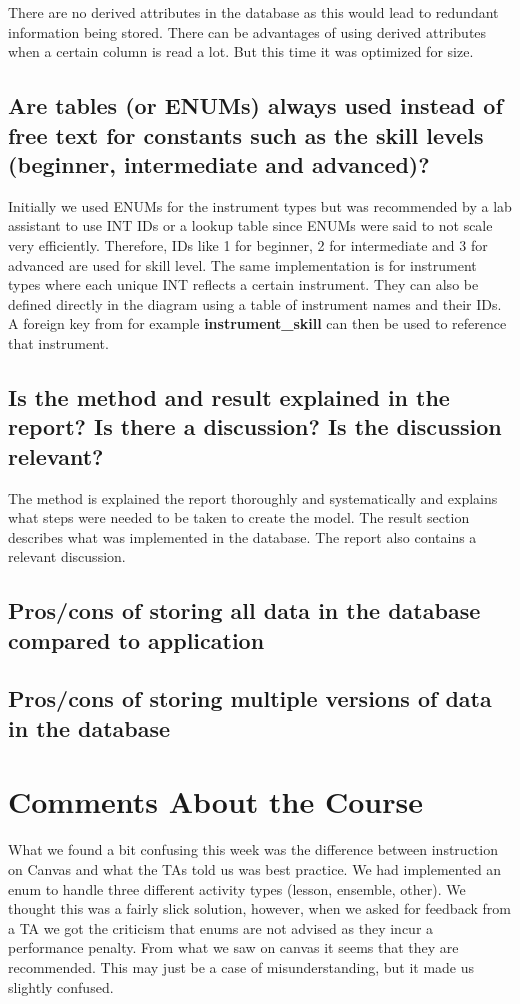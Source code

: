\documentclass[a4paper]{scrartcl}
\begin{document}
There are no derived attributes in the database as this would lead to redundant information being stored. There can be advantages of using derived attributes when a certain column is read a lot. But this time it was optimized for size.

\subsection{Are tables (or ENUMs) always used instead of free text for constants such as the skill levels (beginner, intermediate and advanced)?}
Initially we used ENUMs for the instrument types but was recommended by a lab assistant to use INT IDs or a lookup table since ENUMs were said to not scale very efficiently. Therefore, IDs like 1 for beginner, 2 for intermediate and 3 for advanced are used for skill level. The same implementation is for instrument types where each unique INT reflects a certain instrument. They can also be defined directly in the diagram using a table of instrument names and their IDs. A foreign key from for example \textbf{instrument\_skill} can then be used to reference that instrument.


\subsection{Is the method and result explained in the report? Is there a discussion? Is the discussion relevant?}

The method is explained the report thoroughly and systematically and explains what steps were needed to be taken to create the model. The result section describes what was implemented in the database. The report also contains a relevant discussion.  

\subsection{Pros/cons of storing all data in the database compared to application}


\subsection{Pros/cons of storing multiple versions of data in the database}

\section{Comments About the Course}

What we found a bit confusing this week was the difference between instruction on Canvas and what the TAs told us was best practice. We had implemented an enum to handle three different activity types (lesson, ensemble, other). We thought this was a fairly slick solution, however, when we asked for feedback from a TA we got the criticism that enums are not advised as they incur a performance penalty. From what we saw on canvas it seems that they are recommended. This may just be a case of misunderstanding, but it made us slightly confused.
\end{document}
